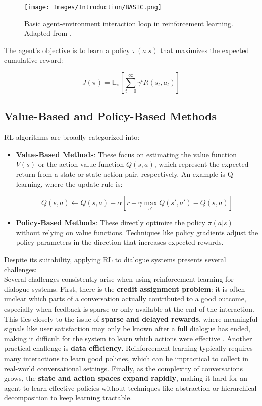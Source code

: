 \documentclass[12pt]{article}
\begin{document}
\begin{figure}[h]
    \centering
    \texttt{[image: Images/Introduction/BASIC.png]}
    \caption{Basic agent-environment interaction loop in reinforcement learning. Adapted from \citet{sutton2018reinforcement}.}
    \label{fig:mdp-loop}
\end{figure}

The agent's objective is to learn a policy $\pi(a|s)$ that maximizes the expected cumulative reward:

\[
J(\pi) = \mathbb{E}_\pi \left[ \sum_{t=0}^{\infty} \gamma^t R(s_t, a_t) \right]
\]

\subsection{Value-Based and Policy-Based Methods}

RL algorithms are broadly categorized into:

\begin{itemize}
    \item \textbf{Value-Based Methods}: These focus on estimating the value function $V(s)$ or the action-value function $Q(s,a)$, which represent the expected return from a state or state-action pair, respectively. An example is Q-learning, where the update rule is:

    \[
    Q(s,a) \leftarrow Q(s,a) + \alpha \left[ r + \gamma \max_{a'} Q(s',a') - Q(s,a) \right]
    \]

    \item \textbf{Policy-Based Methods}: These directly optimize the policy $\pi(a|s)$ without relying on value functions. Techniques like policy gradients adjust the policy parameters in the direction that increases expected rewards.

\end{itemize}

Despite its suitability, applying RL to dialogue systems presents several challenges:\\

Several challenges consistently arise when using reinforcement learning for dialogue systems. First, there is the \textbf{credit assignment problem}: it is often unclear which parts of a conversation actually contributed to a good outcome, especially when feedback is sparse or only available at the end of the interaction. This ties closely to the issue of \textbf{sparse and delayed rewards}, where meaningful signals like user satisfaction may only be known after a full dialogue has ended, making it difficult for the system to learn which actions were effective \citep{peng2017composite}. Another practical challenge is \textbf{data efficiency}. Reinforcement learning typically requires many interactions to learn good policies, which can be impractical to collect in real-world conversational settings. Finally, as the complexity of conversations grows, the \textbf{state and action spaces expand rapidly}, making it hard for an agent to learn effective policies without techniques like abstraction or hierarchical decomposition to keep learning tractable.\\
\end{document}
